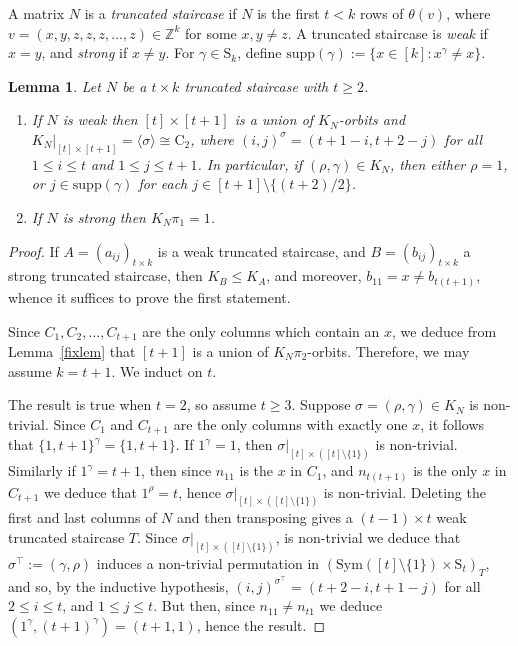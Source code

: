\documentclass{daj}
\renewcommand\S{\mathrm{S}}
\newcommand\supp{\mathrm{supp}}
\newcommand\Z{\mathbb{Z}}
\theoremstyle{plain}
\newtheorem{lemma}[theorem]{Lemma}
\theoremstyle{definition}
\begin{document}
A matrix $N$ is a \emph{truncated staircase} if $N$ is the first $t<k$ rows of $\theta(v)$, where $v=(x,y,z,z,z,\dots,z)\in\Z^k$ for some $x,y\ne z$. A truncated staircase is \emph{weak} if $x=y$, and \emph{strong} if $x\ne y$. For $\gamma\in\S_k$, define $\supp(\gamma):=\{x\in [k] : x^\gamma\ne x\}$.

\begin{lemma}\label{stair}
Let $N$ be a $t\times k$ truncated staircase with $t\geq 2$.\begin{enumerate}
\item[(i)] If $N$ is weak then $[t]\times[t+1]$ is a union of $K_N$-orbits and $K_N|_{[t]\times [t+1]}=\langle \sigma\rangle\cong \mathrm{C}_2$, where $(i,j)^{\sigma}=(t+1-i,t+2-j)$ for all $1\leq i\leq t$ and $1\leq j\leq t+1$. In particular, if $(\rho,\gamma)\in K_N$, then either $\rho=1$, or $j\in\supp(\gamma)$ for each $j\in [t+1]\setminus \{(t+2)/2\}$.
\item[(ii)] If $N$ is strong then $K_N\pi_1=1$.
\end{enumerate}
\end{lemma}
\begin{proof}
If $A=(a_{ij})_{t\times k}$ is a weak truncated staircase, and $B=(b_{ij})_{t\times k}$ a strong truncated staircase, then $K_B\leq K_A$, and moreover, $b_{11}=x\ne b_{t(t+1)}$, whence it suffices to prove the first statement.

 Since $C_1,C_2,\dots, C_{t+1}$ are the only columns which contain an $x$, we deduce from Lemma~\ref{fixlem} that $[t+1]$ is a union of $K_N\pi_2$-orbits.
Therefore, we may assume $k=t+1$. We induct on $t$.

The result is true when $t=2$, so assume $t\geq 3$. Suppose $\sigma=(\rho,\gamma)\in K_N$ is non-trivial. Since $C_1$ and $C_{t+1}$ are the only columns with exactly one $x$, it follows that $\{1,t+1\}^{\gamma}=\{1,t+1\}$. If $1^{\gamma}=1$, then  $\sigma|_{[t]\times ([t]\setminus\{1\})}$ is non-trivial. Similarly if $1^{\gamma}=t+1$, then since $n_{11}$ is the $x$ in $C_1$, and $n_{t(t+1)}$ is the only $x$ in $C_{t+1}$ we deduce that $1^{\rho}=t$, hence $\sigma|_{[t]\times ([t]\setminus\{1\})}$ is non-trivial. Deleting the first and last columns of $N$ and then transposing gives a $(t-1)\times t$ weak truncated staircase $T$. Since $\sigma|_{[t]\times ([t]\setminus\{1\})}$, is non-trivial we deduce that $\sigma^{\top}:=(\gamma,\rho)$ induces a non-trivial permutation in $(\mathrm{Sym}([t]\setminus\{1\})\times \S_{t})_T$, and so, by the inductive hypothesis, $(i,j)^{\sigma^{\top}}=(t+2-i,t+1-j)$ for all $2\leq i\leq t$, and $1\leq j\leq t$. But then, since $n_{11}\ne n_{t1}$ we deduce $(1^{\gamma},(t+1)^{\gamma})=(t+1,1)$, hence the result.
\end{proof}
\end{document}
